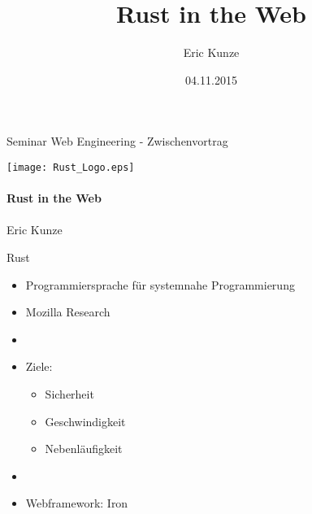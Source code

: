 \documentclass[12pt]{beamer}
\author[Eric Kunze]{Eric Kunze}
\title[]{Rust in the Web}
\date{04.11.2015}
\date{}
\begin{document}
\begin{frame}{\centerline{Seminar Web Engineering - Zwischenvortrag}}
	\begin{center}
		\texttt{[image: Rust\_Logo.eps]}\\~\\
		\Large \textbf{Rust in the Web}\\~\\
		\normalsize Eric Kunze
	\end{center}
 \end{frame}



% 
% 

\begin{frame}{Rust}
	\begin{itemize}
	  \item Programmiersprache für systemnahe Programmierung 
	  \item Mozilla Research
	  \item[]
	  \item Ziele:
	  \begin{itemize}
	    \item Sicherheit
	    \item Geschwindigkeit
	    \item Nebenläufigkeit
	  \end{itemize}
	  \item[]
	  \item Webframework: Iron 
	\end{itemize}
\end{frame}
\end{document}
